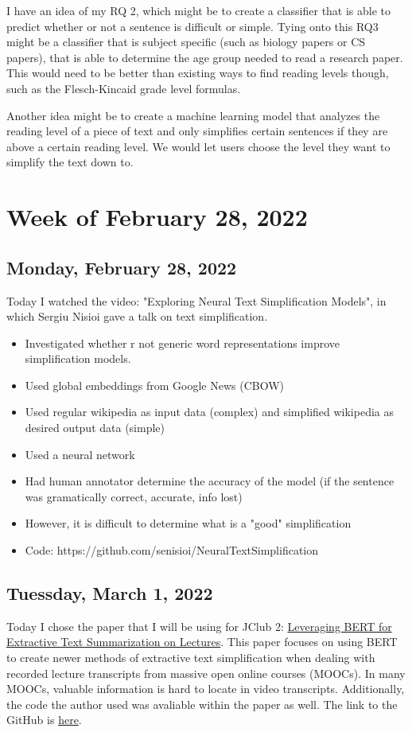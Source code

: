 \documentclass[11pt,letterpaper]{article}
\begin{document}
I have an idea of my RQ 2, which might be to create a classifier that is able to predict whether or not a sentence is difficult or simple. Tying onto this RQ3 might be a classifier that is subject specific (such as biology papers or CS papers), that is able to determine the age group needed to read a research paper. This would need to be better than existing ways to find reading levels though, such as the Flesch-Kincaid grade level formulas.

Another idea might be to create a machine learning model that analyzes the reading level of a piece of text and only simplifies certain sentences if they are above a certain reading level. We would let users choose the level they want to simplify the text down to.

\section{Week of February 28, 2022}

\subsection{Monday, February 28, 2022}
Today I watched the video: "Exploring Neural Text Simplification Models", in which Sergiu Nisioi gave a talk on text simplification.

\begin{itemize}
    \item Investigated whether r not generic word representations improve simplification models.
    \item Used global embeddings from Google News (CBOW)
    \item Used regular wikipedia as input data (complex) and simplified wikipedia as desired output data (simple)
    \item Used a neural network
    \item Had human annotator determine the accuracy of the model (if the sentence was gramatically correct, accurate, info lost)
    \item However, it is difficult to determine what is a "good" simplification
    \item Code: https://github.com/senisioi/NeuralTextSimplification
\end{itemize}

\subsection{Tuessday, March 1, 2022}
Today I chose the paper that I will be using for JClub 2: \href{https://arxiv.org/pdf/1906.04165.pdf}{Leveraging BERT for Extractive Text Summarization on Lectures}. This paper focuses on using BERT to create newer methods of extractive text simplification when dealing with recorded lecture transcripts from massive open online courses (MOOCs). In many MOOCs, valuable information is hard to locate in video transcripts. Additionally, the code the author used was avaliable within the paper as well. The link to the GitHub is \href{https://github.com/dmmiller612/lecture-summarizer}{here}.
\end{document}

